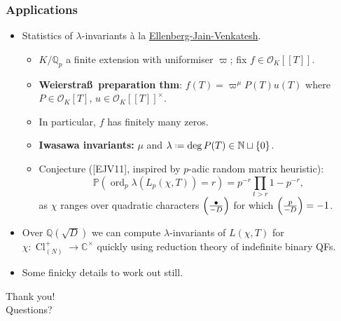 \documentclass[10pt]{beamer}
\let\mbb\mathbb
\newcommand{\ps}[1]{[\![#1]\! ]}
\newcommand{\N}{\mathbb{N}}
\newcommand{\Q}{\mathbb{Q}}
\newcommand{\C}{\mathbb{C}}
\renewcommand{\O}{\mathcal{O}}
\newcommand*{\defeq}{\mathrel{\vcenter{\baselineskip0.5ex \lineskiplimit0pt
      \hbox{\scriptsize.}\hbox{\scriptsize.}}}%
  =}
\DeclareMathOperator{\ord}{ord}
\DeclareMathOperator{\Cl}{Cl}
\begin{document}
\begin{frame}
  \frametitle{Applications}
  \begin{itemize}[leftmargin=2pt]
  \item Statistics of $\lambda$-invariants à la
    \href{https://www.math.ias.edu/~akshay/research/ejv.pdf}{Ellenberg-Jain-Venkatesh}.\pause
    \begin{itemize}[leftmargin=3pt]
  \item $K/\Q_{p}$ a finite extension with uniformiser $\varpi$; fix $f \in
    \O_{K}\ps{T}$. \pause
  \item \textbf{Weierstra\ss\ preparation thm}:  $f(T) =
    \varpi^{\mu}P(T)u(T)$ where $P \in \O_{K}[T]$,  $u \in \O_{K}\ps{T}^{\times}$. \pause
  \item In particular, $f$ has finitely many zeros.\pause
  \item \textbf{Iwasawa invariants:} $\mu$ and $\lambda \defeq \deg P(T) \in \N
    \sqcup \{0\}$.\pause
  \item Conjecture ([EJV11], inspired by $p$-adic random matrix heuristic):
    \[ \mbb P(\ord_{p}\lambda(L_{p}(\chi,T))=r) = p^{-r}\prod_{t > r}1-p^{-r},
    \]
    as $\chi$ ranges over quadratic characters
    $\qty(\frac{\bullet}{-D})$ for which $\qty(\frac{p}{-D}) = -1$.\pause
  \end{itemize}
\item Over $\Q(\sqrt{D})$ we can compute $\lambda$-invariants of $L(\chi, T)$ for
  $\chi \colon \Cl_{(N)}^{+}\to \C^{\times}$ quickly using reduction theory of
  indefinite binary QFs.\pause
  \item Some finicky details to work out still.
\end{itemize}

\end{frame}
\begin{frame}[standout]
  Thank you! \\ 
  Questions?
\end{frame}
\end{document}
